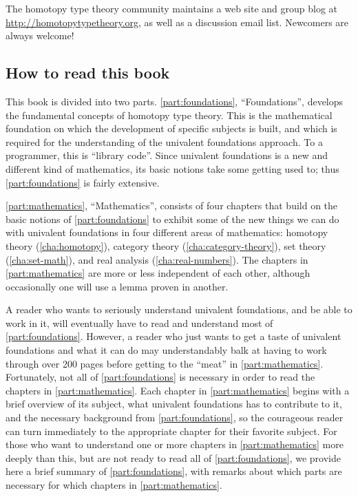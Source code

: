 The homotopy type theory community maintains a web site and group blog at \url{http://homotopytypetheory.org}, as well as a discussion email list.
Newcomers are always welcome!


\subsection{How to read this book}

This book is divided into two parts.
\autoref{part:foundations}, ``Foundations'', develops the fundamental concepts of homotopy type theory.
This is the mathematical foundation on which the development of specific subjects is built, and which is required for the understanding of the univalent foundations approach. To a programmer, this is ``library code''.
Since univalent foundations is a new and different kind of mathematics, its basic notions take some getting used to; thus \autoref{part:foundations} is fairly extensive.

\autoref{part:mathematics}, ``Mathematics'', consists of four chapters that build on the basic notions of \autoref{part:foundations} to exhibit some of the new things we can do with univalent foundations in four different areas of mathematics: homotopy theory (\autoref{cha:homotopy}), category theory (\autoref{cha:category-theory}), set theory (\autoref{cha:set-math}), and real analysis (\autoref{cha:real-numbers}).
The chapters in \autoref{part:mathematics} are more or less independent of each other, although occasionally one will use a lemma proven in another.

A reader who wants to seriously understand univalent foundations, and be able to work in it, will eventually have to read and understand most of \autoref{part:foundations}.
However, a reader who just wants to get a taste of univalent foundations and what it can do may understandably balk at having to work through over 200 pages before getting to the ``meat'' in \autoref{part:mathematics}.
Fortunately, not all of \autoref{part:foundations} is necessary in order to read the chapters in \autoref{part:mathematics}.
Each chapter in \autoref{part:mathematics} begins with a brief overview of its subject, what univalent foundations has to contribute to it, and the necessary background from \autoref{part:foundations}, so the courageous reader can turn immediately to the appropriate chapter for their favorite subject.
For those who want to understand one or more chapters in \autoref{part:mathematics} more deeply than this, but are not ready to read all of \autoref{part:foundations}, we provide here a brief summary of \autoref{part:foundations}, with remarks about which parts are necessary for which chapters in \autoref{part:mathematics}.

